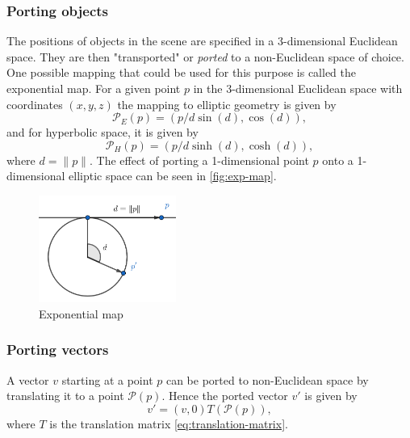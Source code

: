 \subsubsection*{Porting objects}
The positions of objects in the scene are specified in a 3-dimensional Euclidean space.
They are then "transported" or \textit{ported} to a non-Euclidean space of choice.
One possible mapping that could be used for this purpose is called the exponential map.
For a given point $p$ in the 3-dimensional Euclidean space with coordinates $(x, y, z)$ the mapping to elliptic geometry is given by
\begin{equation} \label{eq:elliptic-porting}
    \mathcal{P}_E(p) = (p / d \sin(d), \cos(d)),
\end{equation}
and for hyperbolic space, it is given by
\begin{equation*}
    \mathcal{P}_H(p) = (p / d \sinh(d), \cosh(d)),
\end{equation*}
where $d = \lVert p \rVert$.
The effect of porting a 1-dimensional point $p$ onto a 1-dimensional elliptic space can be seen in \autoref{fig:exp-map}.
\begin{figure}[!htb]
    \centering
    \includegraphics[width=0.4\textwidth]{chapters/theoretical_foundations/sections/non-eudlidean-spaces/resources/exp-map.png}
    \caption{Exponential map}
    \label{fig:exp-map}
\end{figure}

\subsubsection*{Porting vectors}
A vector $v$ starting at a point $p$ can be ported to non-Euclidean space by translating it to a point $\mathcal{P}(p)$.
Hence the ported vector $v'$ is given by
\begin{equation} \label{eq:porting-vector}
    v' = (v, 0) T(\mathcal{P}(p)),
\end{equation}
where $T$ is the translation matrix \ref{eq:translation-matrix}.